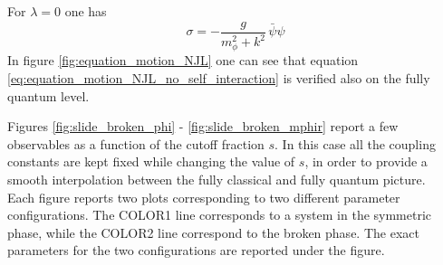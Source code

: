 For $\lambda = 0$ one has
\begin{equation}
    \sigma = -\frac{g}{m_\phi^2 + k^2} \, \bar\psi \psi
    \label{eq:equation_motion_NJL_no_self_interaction}
\end{equation}
In figure \ref{fig:equation_motion_NJL} one can see that equation \eqref{eq:equation_motion_NJL_no_self_interaction} is verified also on the fully quantum level.

Figures \ref{fig:slide_broken_phi} - \ref{fig:slide_broken_mphir} report a few observables as a function of the cutoff fraction $s$. In this case all the coupling constants are kept fixed while changing the value of $s$, in order to provide a smooth interpolation between the fully classical and fully quantum picture. \\
Each figure reports two plots corresponding to two different parameter configurations. The COLOR1 line corresponds to a system in the symmetric phase, while the COLOR2 line correspond to the broken phase. The exact parameters for the two configurations are reported under the figure.

